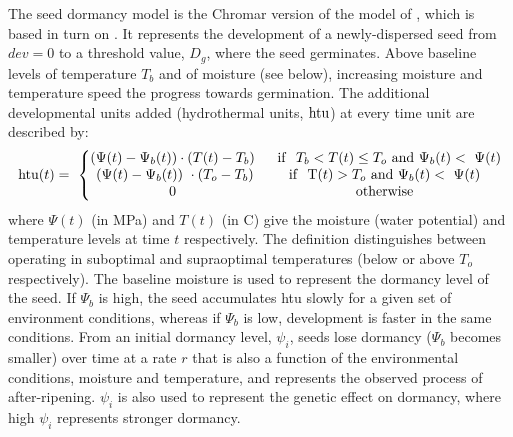 The seed dormancy model is the Chromar version of the model of
\citet{burghardt_modeling_2015}, which is based in turn on
\citet{alvarado_hydrothermal_2002}. It represents the development of a
newly-dispersed seed from \(dev = 0\) to a threshold value, \(D_{g}\), where the
seed germinates. Above baseline levels of temperature $T_b$ and of moisture (see
below), increasing moisture and temperature speed the progress towards
germination. The additional developmental units added (hydrothermal units,
\(\mathrm{htu}\)) at every time unit are described by:
%
\[\mathrm{htu}( t ) = \ \left\{ \begin{matrix}
( \Psi( t ) - \Psi_{b}( t ) ) \cdot ( T( t ) - T_{b} ) \\
\ ( \Psi( t ) - \Psi_{b}( t ) )\  \cdot ( T_{o} - T_{b} ) \\
0 \\
\end{matrix} \right.\ \ \begin{matrix}
\mathrm{\ \ if\ \ }T_{b} < T( t ) \leq T_{o}\ \mathrm{and}\ \Psi_{b}( t ) < \ \Psi(t) \\
\mathrm{if\ \ T}( t ) > T_{o}\ \mathrm{and}\ \Psi_{b}( t ) < \ \Psi( t ) \\
\mathrm{otherwise} \\
\end{matrix}\]
%
where \(\Psi(t)\) (in MPa) and \(T(t)\) (in \textdegree C) give the moisture
(water potential) and temperature levels at time \(t\) respectively. The
definition distinguishes between operating in suboptimal and supraoptimal
temperatures (below or above $T_{o}$ respectively). The baseline
moisture is used to represent the dormancy level of the seed. If \(\Psi_{b}\) is
high, the seed accumulates htu slowly for a given set of environment conditions,
whereas if \(\Psi_{b}\) is low, development is faster in the same
conditions. From an initial dormancy level, \(\psi_{i}\), seeds lose dormancy
(\(\Psi_{b}\) becomes smaller) over time at a rate $r$ that is also a function
of the environmental conditions, moisture and temperature, and represents the
observed process of after-ripening.  \(\psi_{i}\) is also used to represent the
genetic effect on dormancy, where high \(\psi_{i}\) represents stronger
dormancy.

